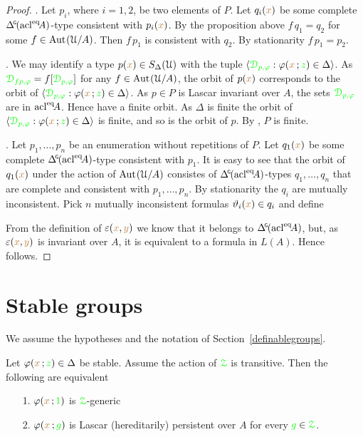 \begin{proof}
  .
  Let $p_i$, where $i=1,2$, be two elements of $P$.
  Let $q_i({\color{brown} x})$ be some complete $\GDelta(\acl^\eq\!A)$-type consistent with $p_i({\color{brown} x})$.
  By the proposition above $f\,q_1=q_2$ for some $f\in{\rm Aut\kern.15ex}(\EuScript U/A)$.
  Then $f\,p_1$ is consistent with $q_2$.
  By stationarity $f\,p_1=p_2$.

  .
  We may identify a type $p({\color{brown} x})\in S_\Delta(\EuScript U)$ with the tuple $\langle{\color{green}\EuScript D_{p,\varphi}}:\varphi({\color{brown} x}\,;{\color{green} z})\in\Delta\rangle$.
  As ${\color{green}\EuScript D_{fp,\varphi}}=f[{\color{green}\EuScript D_{p,\varphi}}]$ for any $f\in{\rm Aut\kern.15ex}(\EuScript U/A)$, the orbit of $p({\color{brown} x})$ corresponds to the orbit of $\langle{\color{green}\EuScript D_{p,\varphi}}:\varphi({\color{brown} x}\,;{\color{green} z})\in\Delta\rangle$.
  As $p\in P$ is Lascar invariant over $A$, the sets ${\color{green}\EuScript D_{p,\varphi}}$ are in ${\rm acl}^{{\rm eq}}\!A$.
  Hence have a finite orbit.
  As $\Delta$ is finite the orbit of $\langle{\color{green}\EuScript D_{p,\varphi}}:\varphi({\color{brown} x}\,;{\color{green} z})\in\Delta\rangle$ is finite, and so is the orbit of $p$.
  By , $P$ is finite.

  . 
  Let $p_1,\dots,p_n$ be an enumeration without repetitions of $P$.
  Let $q_1({\color{brown} x})$ be some complete $\GDelta(\acl^\eq\!A)$-type consistent with $p_1$.
  It is easy to see that the orbit of $q_1({\color{brown} x})$ under the action of ${\rm Aut\kern.15ex}(\EuScript U/A)$ consistes of $\GDelta(\acl^\eq\!A)$-types $q_1,\dots,q_n$ that are complete and consistent with $p_1,\dots,p_n$.
  By stationarity the $q_i$ are mutually inconsistent.
  Pick $n$ mutually inconsistent formulas $\vartheta_i({\color{brown} x})\in q_i$ and define

  
  From the definition of $\varepsilon({\color{brown} x},{\color{brown} y})$ we know that it belongs to $\GDelta(\acl^\eq\!A)$, but, as $\varepsilon({\color{brown} x},{\color{brown} y})$ is invariant over $A$, it is equivalent to a formula in $L(A)$.
  Hence  follows.
\end{proof}

\section{Stable groups}\label{stable_groups}

We assume the hypotheses and the notation of Section~\ref{definablegroups}.

\begin{theorem}\label{thm_Ggeneric_persistent}
  Let $\varphi({\color{brown} x}\,;{\color{green} z})\in\Delta$ be stable.
  Assume the action of ${\color{green}\EuScript Z}$ is transitive.
  Then the following are equivalent
  \begin{itemize}
    \item [1.] $\varphi({\color{brown} x}\,;{\color{green} 1})$ is ${\color{green}\EuScript Z}$-generic
    \item [2.] $\varphi({\color{brown} x}\,;{\color{green} g})$ is Lascar (hereditarily) persistent over $A$ for every ${\color{green} g}\in{\color{green}\EuScript Z}$.
  \end{itemize}
\end{theorem}

